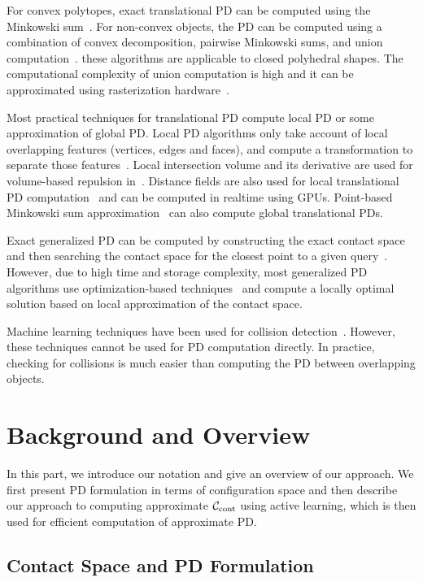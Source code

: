 For convex polytopes, exact translational PD can be computed using
the Minkowski sum~\cite{Gino:2001:GDC,Agarwal:2000:CPD,Kim:2002:DEEP}.
For non-convex objects, the PD can be computed using a combination of convex decomposition, pairwise Minkowski sums, and union computation~\cite{Kim:2002:FPD}. these algorithms are applicable to closed polyhedral shapes. The computational complexity of union computation is high and it can be approximated using rasterization hardware~\cite{Kim:2002:FPD}.

Most practical techniques for translational PD compute local PD
or some approximation of global PD. Local PD algorithms only take
account of local overlapping features (vertices, edges and faces),
and compute a transformation to separate those
features~\cite{Guendelman:2003:NRB,Redon:2006:AFM,Lien:2009:ASM,Tang:2009:IHD,Tang:2012:CPF}. Local intersection volume and its derivative are used for volume-based repulsion in~\cite{Wang12}.
Distance fields are also used for local translational PD
computation~\cite{Heidelberger04} and can be computed in realtime using GPUs.
Point-based Minkowski
sum approximation~\cite{Lien:2008:CMS} can also compute global translational PDs.

Exact generalized PD can be computed by constructing the
exact contact space and then searching the contact space for the
closest point to a given query~\cite{Zhang:2007:GPD}. However,
due to high time and storage complexity, most
generalized PD algorithms use optimization-based
techniques~\cite{Nawratil:2009:GPD,Zhang:2007:AFP,Je:2012:PRP} and compute a locally
optimal solution based on local approximation of the contact space.

Machine learning techniques have been used for collision detection~\cite{Doshi:2007:ISRR,Pan:2011:ISRR}. However, these techniques cannot be used for PD computation directly. In practice, checking for collisions is much easier than computing the PD between overlapping objects.

\section{Background and Overview}
\label{sec:2:overview}
In this part, we introduce our notation and give an overview of our approach. We first present PD formulation in terms of configuration space and then describe our approach to computing approximate $\mathcal C_\text{cont}$ using active learning, which is then used for efficient computation of approximate PD.

\subsection{Contact Space and PD Formulation}
